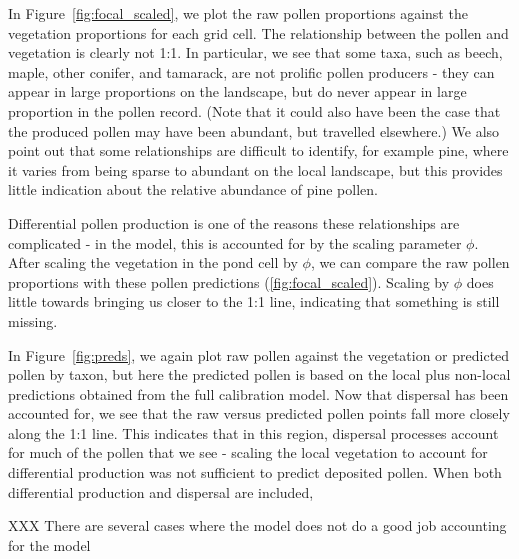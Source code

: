 \documentclass[12pt]{article}
\begin{document}
In Figure~\ref{fig:focal_scaled}, we plot the raw pollen proportions
against the vegetation proportions for each grid cell. The
relationship between the pollen and vegetation is clearly not 1:1. In
particular, we see that some taxa, such as beech, maple, other
conifer, and tamarack, are not prolific pollen producers - they can
appear in large proportions on the landscape, but do never appear in
large proportion in the pollen record. (Note that it could also have
been the case that the produced pollen may have been abundant, but
travelled elsewhere.) We also point out that some relationships are
difficult to identify, for example pine, where it varies from being
sparse to abundant on the local landscape, but this provides little
indication about the relative abundance of pine pollen.

Differential pollen production is one of the reasons these
relationships are complicated - in the model, this is accounted for by
the scaling parameter $\phi$. After scaling the vegetation in the pond
cell by $\phi$, we can compare the raw pollen proportions with these
pollen predictions (\ref{fig:focal_scaled}). Scaling by $\phi$ does little towards bringing us closer to the 1:1 line, indicating that something is still missing.

In Figure~\ref{fig:preds}, we again plot raw pollen against the vegetation
or predicted pollen by taxon, but here the predicted pollen is based
on the local plus non-local predictions obtained from the full
calibration model. Now that dispersal has been accounted for, we see
that the raw versus predicted pollen points fall more closely along
the 1:1 line. This indicates that in this region, dispersal processes account for much of the pollen that we see - scaling the local vegetation to account for differential production was not sufficient to predict deposited pollen. When both differential production and dispersal are included, 

XXX There are several cases where the model does not do a good job accounting for the model   
\end{document}

